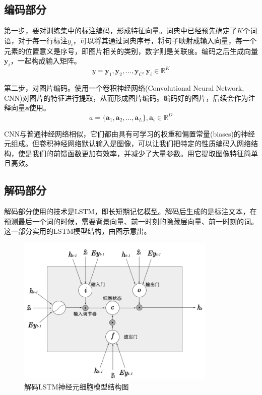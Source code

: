 \subsection{编码部分}
第一步，要对训练集中的标注编码，形成特征向量。词典中已经预先确定了$K$个词语，对于每一行标注$y_i$，可以将其通过词典序号，将句子映射成输入向量，每一个元素的位置意义是序号，即图片相关的类别，数字则是关联度。编码之后生成向量$\textbf{y}_i$，一起构成输入矩阵。
$$y = {\textbf{y}_1, \textbf{y}_2, ..., \textbf{y}_C}, \textbf{y}_i\in \mathbb{R}^K$$

第二步，对图片编码。使用一个卷积神经网络(Convolutional Neural Network, CNN)对图片的特征进行提取，从而形成图片编码。编码好的图片，后续会作为注释向量$\textbf{a}$使用。
$$a = \{\textbf{a}_1, \textbf{a}_2, ... , \textbf{a}_L\}, \textbf{a}_i \in \mathbb{R}^D$$

CNN与普通神经网络相似，它们都由具有可学习的权重和偏置常量(biases)的神经元组成。但卷积神经网络默认输入是图像，可以让我们把特定的性质编码入网络结构，使是我们的前馈函数更加有效率，并减少了大量参数。用它提取图像特征简单且高效。

\subsection{解码部分}
解码部分使用的技术是LSTM，即长短期记忆模型。解码后生成的是标注文本，在预测最后一个词的时候，需要背景向量、前一时刻的隐藏层向量、前一时刻的词。这一部分实用的LSTM模型结构，由图示意出。
\begin{figure}[!htbp]
    \centering
    \includegraphics[width=0.85\textwidth]{figures/lstm_token.png}
    \caption{解码LSTM神经元细胞模型结构图}
    \label{fig:lstm_tokenize}
\end{figure}

